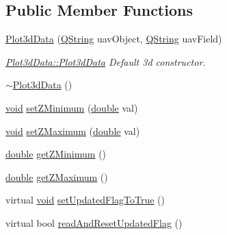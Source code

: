 \subsection*{Public Member Functions}
\begin{DoxyCompactItemize}
\item 
\hyperlink{group___scope_plugin_ga1f2325d51b8163d0c535e07fda3ff043}{Plot3d\-Data} (\hyperlink{group___u_a_v_objects_plugin_gab9d252f49c333c94a72f97ce3105a32d}{Q\-String} uav\-Object, \hyperlink{group___u_a_v_objects_plugin_gab9d252f49c333c94a72f97ce3105a32d}{Q\-String} uav\-Field)
\begin{DoxyCompactList}\small\item\em \hyperlink{group___scope_plugin_ga1f2325d51b8163d0c535e07fda3ff043}{Plot3d\-Data\-::\-Plot3d\-Data} Default 3d constructor. \end{DoxyCompactList}\item 
\hyperlink{group___scope_plugin_gaba0a6fcc762d6818f231df0e8a975089}{$\sim$\-Plot3d\-Data} ()
\item 
\hyperlink{group___u_a_v_objects_plugin_ga444cf2ff3f0ecbe028adce838d373f5c}{void} \hyperlink{group___scope_plugin_gaa8457325b9ed2d7199e882002d9cb64f}{set\-Z\-Minimum} (\hyperlink{_super_l_u_support_8h_a8956b2b9f49bf918deed98379d159ca7}{double} val)
\item 
\hyperlink{group___u_a_v_objects_plugin_ga444cf2ff3f0ecbe028adce838d373f5c}{void} \hyperlink{group___scope_plugin_gad2d6739b5faacba8f73c88fbc9b6592d}{set\-Z\-Maximum} (\hyperlink{_super_l_u_support_8h_a8956b2b9f49bf918deed98379d159ca7}{double} val)
\item 
\hyperlink{_super_l_u_support_8h_a8956b2b9f49bf918deed98379d159ca7}{double} \hyperlink{group___scope_plugin_ga1b7cd5b46f3d8a13bcdba217cc7fe392}{get\-Z\-Minimum} ()
\item 
\hyperlink{_super_l_u_support_8h_a8956b2b9f49bf918deed98379d159ca7}{double} \hyperlink{group___scope_plugin_ga9d0722b373e8cf2ea23d29cc8717f8ef}{get\-Z\-Maximum} ()
\item 
virtual \hyperlink{group___u_a_v_objects_plugin_ga444cf2ff3f0ecbe028adce838d373f5c}{void} \hyperlink{group___scope_plugin_ga08cc07e86d20dc6dad41488e34bb196c}{set\-Updated\-Flag\-To\-True} ()
\item 
virtual bool \hyperlink{group___scope_plugin_ga3d0789d96a38bc51e7e1be13754ba43e}{read\-And\-Reset\-Updated\-Flag} ()
\end{DoxyCompactItemize}
